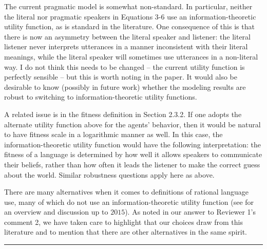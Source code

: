 \documentclass[12pt,a4paper]{article}
\begin{document}
\begin{mdframed}[backgroundcolor=gray!25,linecolor=gray!25,frametitle= Reviewer \thereviewerCounter~comment \thereviewerCommentCounter \hfill ~~({\it definitions in rational language use})]
%
The current pragmatic model is somewhat non-standard. In particular, neither the literal nor pragmatic speakers in Equations 3-6 use an information-theoretic utility function, as is standard in the literature. One consequence of this is that there is now an asymmetry between the literal speaker and listener: the literal listener never interprets utterances in a manner inconsistent with their literal meanings, while the literal speaker will sometimes use utterances in a non-literal way. I do not think this needs to be changed -- the current utility function is perfectly sensible -- but this is worth noting in the paper. It would also be desirable to know (possibly in future work) whether the modeling results are robust to switching to information-theoretic utility functions.

%
\end{mdframed}
\begin{mdframed}[backgroundcolor=gray!25,linecolor=gray!25]
%
A related issue is in the fitness definition in Section 2.3.2. If one adopts the alternate utility function above for the agents' behavior, then it would be natural to have fitness scale in a logarithmic manner as well. In this case, the information-theoretic utility function would have the following interpretation: the fitness of a language is determined by how well it allows speakers to communicate their beliefs, rather than how often it leads the listener to make the correct guess about the world. Similar robustness questions apply here as above.

%
\end{mdframed}
There are many alternatives when it comes to definitions of rational language use, many of which do not use an information-theoretic utility function (see \citealt{qing+franke:2015} for an overview and discussion up to $2015$). As noted in our answer to Reviewer 1's comment 2, we have taken care to highlight that our choices draw from this literature and to mention that there are other alternatives in the same spirit. 

%

\vspace{0.5cm}

\noindent\rule{\textwidth}{1pt}
\end{document}
